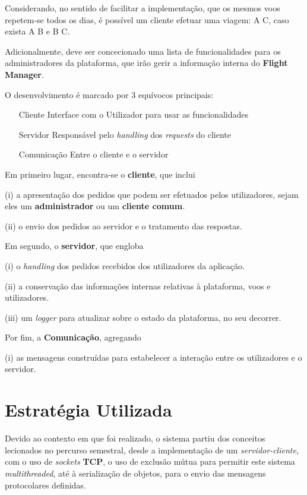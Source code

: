 \documentclass[a4paper,11pt]{scrreprt}
\begin{document}
Considerando, no sentido de facilitar a implementação, que os mesmos voos repetem-se todos os dias, é possível
um cliente efetuar uma viagem: A \rightarrow C, caso exista A \rightarrow B e B \rightarrow C.

Adicionalmente, deve ser concecionado uma lista de funcionalidades para os administradores da plataforma, que 
irão gerir a informação interna do \textbf{Flight Manager}.

O desenvolvimento é marcado por 3 equívocos principais:
\begin{itemize}
    \item[Cliente] Interface com o Utilizador para usar as funcionalidades
    \item[Servidor] Responsável pelo \textit{handling} dos \textit{requests} do cliente
    \item[Comunicação] Entre o cliente e o servidor 
\end{itemize}

Em primeiro lugar, encontra-se o \textbf{cliente}, que inclui

(i) a apresentação dos pedidos que podem ser efetuados pelos utilizadores, sejam eles
um \textbf{administrador} ou um \textbf{cliente comum}.

(ii) o envio dos pedidos ao servidor e o tratamento das respostas.

Em segundo, o \textbf{servidor}, que engloba

(i) o \textit{handling} dos pedidos recebidos dos utilizadores da aplicação.

(ii) a conservação das informações internas relativas à plataforma, voos e utilizadores.

(iii) um \textit{logger} para atualizar sobre o estado da plataforma, no seu decorrer.

Por fim, a \textbf{Comunicação}, agregando

(i) as mensagens construídas para estabelecer a interação entre os utilizadores e o servidor.

\section{Estratégia Utilizada} \label{strat_esc}

Devido ao contexto em que foi realizado, o sistema partiu dos conceitos lecionados no percurso semestral, desde 
a implementação de um \textit{servidor-cliente}, com o uso de \textit{sockets} \textbf{TCP}, o uso de exclusão 
mútua para permitir este sistema \textit{multithreaded}, até à serialização de objetos, para o envio das mensagens 
protocolares definidas.
\end{document}
